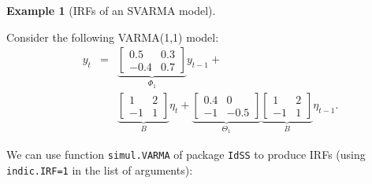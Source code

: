\documentclass[
  11pt,
]{book}
\theoremstyle{definition}
\theoremstyle{definition}
\newtheorem{example}{Example}[chapter]
\theoremstyle{definition}
\theoremstyle{definition}
\theoremstyle{remark}
\begin{document}
\begin{example}[IRFs of an SVARMA model]
\protect\hypertarget{exm:IRFVARMA}{}\label{exm:IRFVARMA}

Consider the following VARMA(1,1) model:
\begin{eqnarray}
\quad y_t &=&
\underbrace{\left[\begin{array}{cc}
0.5 & 0.3 \\
-0.4 & 0.7
\end{array}\right]}_{\Phi_1}
y_{t-1} +  \\
&& \underbrace{\left[\begin{array}{cc}
1 & 2 \\
-1 & 1
\end{array}\right]}_{B}\eta_t + \underbrace{\left[\begin{array}{cc}
0.4 & 0 \\
-1 & -0.5
\end{array}\right]}_{\Theta_1} \underbrace{\left[\begin{array}{cc}
1 & 2 \\
-1 & 1
\end{array}\right]}_{B}\eta_{t-1}.
\label{eq:VARMA111}
\end{eqnarray}

We can use function \texttt{simul.VARMA} of package \texttt{IdSS} to produce IRFs (using \texttt{indic.IRF=1} in the list of arguments):


\end{example}
\end{document}
